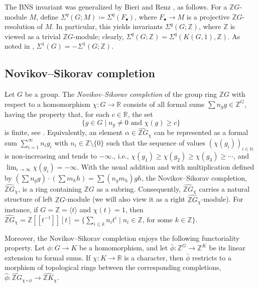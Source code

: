 \documentclass[11pt]{amsart}
\theoremstyle{definition}
\newcommand{\N}{\mathbb{N}}
\newcommand{\Z}{\mathbb{Z}}
\newcommand{\R}{\mathbb{R}}
\begin{document}
The BNS invariant was generalized by Bieri and Renz \cite{BR}, 
as follows. For a $\Z{G}$-module $M$, define  
$\Sigma^{q}(G; M)\coloneqq\Sigma^{q}(F_{\bullet})$, where 
$F_{\bullet} \to M$ is a projective $\Z{G}$-resolution of $M$.  
In particular, this yields invariants $\Sigma^{q}(G;\Z)$, 
where $\Z$ is viewed as a trivial $\Z{G}$-module; 
clearly, $\Sigma^{q}(G;\Z)=\Sigma^{q} (K(G,1),\Z)$.  
As noted in \cite[\S 1.3]{BR}, $\Sigma^1(G)=-\Sigma^1(G;\Z)$.  

\subsection{Novikov--Sikorav completion}
\label{subsec:novikov}
Let $G$ be a group. 
The {\em Novikov--Sikorav completion}\/ of the group ring $\Z{G}$ 
with respect to a homomorphism $\chi\colon G\to \R$ consists of 
all formal sums $\sum n_g g\in \Z^{G}$, 
having the property that, for each $c\in \R$, the set 
\begin{equation}
\label{eq:nov-sik}
\big\{g\in G \mid \text{$n_g \ne 0$ and $\chi(g) \ge c$}\big\}
\end{equation} 
is finite, see \cite{Novikov, Sk87, Far}. 
Equivalently, an element $\alpha \in \widehat{\Z{G}}_{\chi}$ 
can be represented as a formal sum 
$\sum_{i=1}^\infty n_i g_i$ with $n_i \in \Z \setminus \{0\}$ 
such that the sequence of 
values $(\chi(g_i))_{i \in \N}$ is non-increasing  and tends to $-\infty$., i.e., 
$\chi(g_1) \ge \chi(g_2) \ge \chi(g_3) \ge \cdots$, 
and $\lim_{i \to \infty} \chi(g_i) = -\infty$. 
With the usual addition and with multiplication defined by 
$(\sum n_g g) \cdot  (\sum m_h h) = \sum (n_g m_h) g h$, 
the Novikov--Sikorav completion, $\widehat{\Z{G}}_{\chi}$, is a ring 
containing $\Z{G}$ as a subring. Consequently, $\widehat{\Z{G}}_{\chi}$ 
carries a natural structure of left $\Z{G}$-module (we will also view 
it as a right $\widehat{\Z{G}}_{\chi}$-module). 
For instance, if 
$G=\Z=\langle t \rangle$ and $\chi(t)=1$, then 
$\widehat{\Z{G}}_{\chi}=\Z[[t^{-1}]][t]=
\{\sum_{i\le k} n_i t^i \mid \text{$n_i\in \Z$, for some $k\in \Z$}\}$. 

Moreover, the Novikov--Sikorav completion enjoys the following 
functoriality property. Let $\phi\colon G\to K$ be a homomorphism, and 
let $\bar\phi\colon \Z^{G}\to \Z^{K}$ be its linear extension to 
formal sums. If $\chi\colon K\to \R$ is a character, then 
$\bar\phi$ restricts to a morphism of topological rings 
between the corresponding completions, $\hat\phi \colon  
\widehat{\Z{G}}_{\chi\circ \phi} \to \widehat{\Z{K}}_{\chi}$. 
\end{document}
